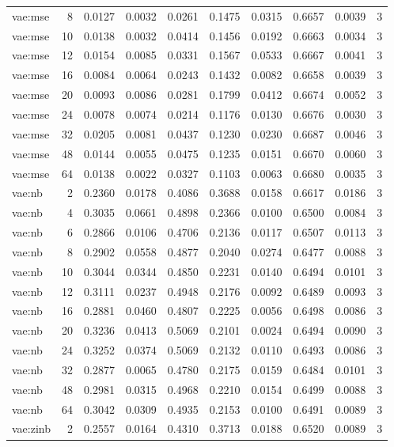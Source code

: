 \begin{tabular}{lrrrrrrrrr}
vae:mse & 8 & 0.0127 & 0.0032 & 0.0261 & 0.1475 & 0.0315 & 0.6657 & 0.0039 & 3 \\
vae:mse & 10 & 0.0138 & 0.0032 & 0.0414 & 0.1456 & 0.0192 & 0.6663 & 0.0034 & 3 \\
vae:mse & 12 & 0.0154 & 0.0085 & 0.0331 & 0.1567 & 0.0533 & 0.6667 & 0.0041 & 3 \\
vae:mse & 16 & 0.0084 & 0.0064 & 0.0243 & 0.1432 & 0.0082 & 0.6658 & 0.0039 & 3 \\
vae:mse & 20 & 0.0093 & 0.0086 & 0.0281 & 0.1799 & 0.0412 & 0.6674 & 0.0052 & 3 \\
vae:mse & 24 & 0.0078 & 0.0074 & 0.0214 & 0.1176 & 0.0130 & 0.6676 & 0.0030 & 3 \\
vae:mse & 32 & 0.0205 & 0.0081 & 0.0437 & 0.1230 & 0.0230 & 0.6687 & 0.0046 & 3 \\
vae:mse & 48 & 0.0144 & 0.0055 & 0.0475 & 0.1235 & 0.0151 & 0.6670 & 0.0060 & 3 \\
vae:mse & 64 & 0.0138 & 0.0022 & 0.0327 & 0.1103 & 0.0063 & 0.6680 & 0.0035 & 3 \\
vae:nb & 2 & 0.2360 & 0.0178 & 0.4086 & 0.3688 & 0.0158 & 0.6617 & 0.0186 & 3 \\
vae:nb & 4 & 0.3035 & 0.0661 & 0.4898 & 0.2366 & 0.0100 & 0.6500 & 0.0084 & 3 \\
vae:nb & 6 & 0.2866 & 0.0106 & 0.4706 & 0.2136 & 0.0117 & 0.6507 & 0.0113 & 3 \\
vae:nb & 8 & 0.2902 & 0.0558 & 0.4877 & 0.2040 & 0.0274 & 0.6477 & 0.0088 & 3 \\
vae:nb & 10 & 0.3044 & 0.0344 & 0.4850 & 0.2231 & 0.0140 & 0.6494 & 0.0101 & 3 \\
vae:nb & 12 & 0.3111 & 0.0237 & 0.4948 & 0.2176 & 0.0092 & 0.6489 & 0.0093 & 3 \\
vae:nb & 16 & 0.2881 & 0.0460 & 0.4807 & 0.2225 & 0.0056 & 0.6498 & 0.0086 & 3 \\
vae:nb & 20 & 0.3236 & 0.0413 & 0.5069 & 0.2101 & 0.0024 & 0.6494 & 0.0090 & 3 \\
vae:nb & 24 & 0.3252 & 0.0374 & 0.5069 & 0.2132 & 0.0110 & 0.6493 & 0.0086 & 3 \\
vae:nb & 32 & 0.2877 & 0.0065 & 0.4780 & 0.2175 & 0.0159 & 0.6484 & 0.0101 & 3 \\
vae:nb & 48 & 0.2981 & 0.0315 & 0.4968 & 0.2210 & 0.0154 & 0.6499 & 0.0088 & 3 \\
vae:nb & 64 & 0.3042 & 0.0309 & 0.4935 & 0.2153 & 0.0100 & 0.6491 & 0.0089 & 3 \\
vae:zinb & 2 & 0.2557 & 0.0164 & 0.4310 & 0.3713 & 0.0188 & 0.6520 & 0.0089 & 3 \\

\end{tabular}
